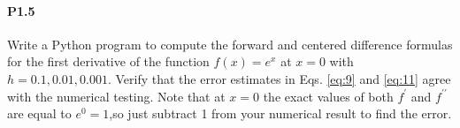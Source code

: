 \documentclass{book}
\theoremstyle{plain}
\theoremstyle{definition}
\numberwithin{exm}{chapter}
\theoremstyle{remark}
\theoremstyle{summary}
\theoremstyle{overview}
\begin{document}
\paragraph*{P1.5}
Write a Python program to compute the forward and centered difference formulas for the first derivative of the function $f(x) = e^x $ at $x = 0$ with $h = 0.1, 0.01, 0.001$. Verify that the error estimates in Eqs. \eqref{eq:9} and \eqref{eq:11} agree with the numerical testing. Note that at $x =0$ the exact values of both $f^\prime$ and $f^{\prime\prime}$ are equal to $e^0 = 1$,so just subtract 1 from your numerical result to find the error.

\end{document}
